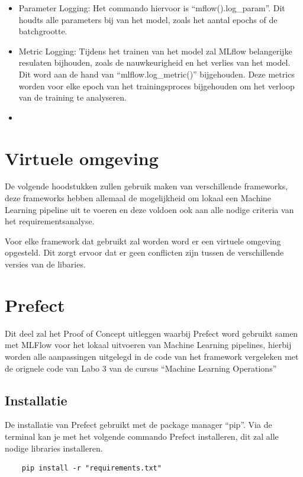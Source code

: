 \begin{itemize}
    \item Parameter Logging: Het commando hiervoor is ``mflow().log\_param''. Dit houdts alle parameters bij van het model, zoals het aantal epochs of de batchgrootte.
    \item Metric Logging: Tijdens het trainen van het model zal MLflow belangerijke resulaten bijhouden, zoals de nauwkeurigheid en het verlies van het model. Dit word aan de hand van ``mlflow.log\_metric()'' bijgehouden. Deze metrics worden voor elke epoch van het trainingsproces bijgehouden om het verloop van de training te analyseren.
    \item 
\end{itemize}

\section{Virtuele omgeving}
De volgende hoodstukken zullen gebruik maken van verschillende frameworks, deze frameworks hebben allemaal de mogelijkheid om lokaal een Machine Learning pipeline uit te voeren en deze voldoen ook aan alle nodige criteria van het requirementsanalyse.

Voor elke framework dat gebruikt zal worden word er een virtuele omgeving opgesteld. Dit zorgt ervoor dat er geen conflicten zijn tussen de verschillende versies van de libaries.
\section{Prefect}
Dit deel zal het Proof of Concept uitleggen waarbij Prefect word gebruikt samen met MLFlow voor het lokaal uitvoeren van Machine Learning pipelines, hierbij worden alle aanpassingen uitgelegd in de code van het framework vergeleken met de orignele code van Labo 3 van de cursus ``Machine Learning Operations''
\subsection{Installatie}
De installatie van Prefect gebruikt met de package manager ``pip''. Via de terminal kan je met het volgende commando Prefect installeren, dit zal alle nodige libraries installeren.
\begin{verbatim}
    pip install -r "requirements.txt"
\end{verbatim}
